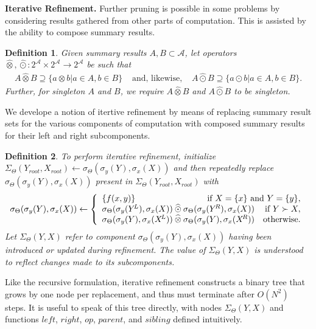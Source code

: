\documentclass{article}
\newtheorem{definition} {Definition}
\newcommand{\GNP}[1][\psi]{{#1}_{\Theta}}
\newcommand{\otimeshat}{\mathbin{\widehat{\otimes}}}
\newcommand{\odothat}{\mathbin{\widehat{\odot}}}
\begin{document}
{\bf Iterative Refinement.}  Further pruning is possible in some
problems by considering results gathered from other parts of
computation.  This is assisted by the ability to compose summary
results.
\begin{definition}
  Given summary results $A, B \subset \mathcal{A}$, let operators
  $\otimeshat, \odothat \colon 2^{\mathcal{A}} \times 2^{\mathcal{A}}
  \to 2^{\mathcal{A}}$ be such that
  \[ \begin{array}{rcl}
    A \otimeshat B \supseteq \{a \otimes b | a \in A, b \in B\} & \mbox{ and, likewise, } & A \odothat B \supseteq \{a \odot b | a \in A, b \in B\}.
  \end{array} \]
  Further, for singleton $A$ and $B$, we require $A \otimeshat B$ and
  $A \odothat B$ to be singleton.
\end{definition}
\noindent We develope a notion of itertive refinement by means of
replacing summary result sets for the various components of
computation with composed summary results for their left and right
subcomponents.
\begin{definition}
  To perform {\em iterative refinement}, initialize
  $\GNP[\Sigma](Y_{root},X_{root}) \leftarrow
  \GNP[\sigma](\sigma_y(Y),\sigma_x(X))$ and then repeatedly replace
  $\GNP[\sigma](\sigma_y(Y),\sigma_x(X))$ present in
  $\GNP[\Sigma](Y_{root},X_{root})$ with
  \[
  \GNP[\sigma](\sigma_y(Y),\sigma_x(X)) \leftarrow \left\{ \begin{array}{lrr}
    \{f(x,y)\} & \multicolumn{2}{r}{\mbox{if } X = \{x\} \mbox{ and } Y = \{y\},} \\
    \multicolumn{2}{l}{\GNP[\sigma](\sigma_y(Y^{\!L}),\sigma_x(X)) \odothat \GNP[\sigma](\sigma_y(Y^{\!R}),\sigma_x(X))} & \mbox{if } Y \succ X, \\
    \multicolumn{2}{l}{\GNP[\sigma](\sigma_y(Y),\sigma_x(X^{\!L})) \otimeshat \GNP[\sigma](\sigma_y(Y),\sigma_x(X^{\!R}))} & \mbox{otherwise}.
  \end{array} \right.
  \]
  Let $\GNP[\Sigma](Y,X)$ refer to component
  $\GNP[\sigma](\sigma_y(Y),\sigma_x(X))$ having been introduced or
  updated during refinement.  The value of $\GNP[\Sigma](Y,X)$ is
  understood to reflect changes made to its subcomponents.
\end{definition}
\noindent Like the recursive formulation, iterative refinement
constructs a binary tree that grows by one node per replacement, and
thus must terminate after $O(N^2)$ steps.  It is useful to speak of
this tree directly, with nodes $\GNP[\Sigma](Y,X)$ and functions
$left$, $right$, $op$, $parent$, and $sibling$ defined intuitively.
\end{document}
